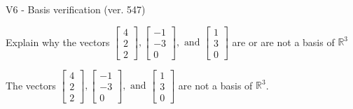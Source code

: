 \begin{exercise}
  \begin{exerciseTitle}V6 - Basis verification (ver. 547)\end{exerciseTitle}
  \begin{exerciseStatement}
    Explain why the vectors \(\left[\begin{array}{r}
4 \\
2 \\
2
\end{array}\right] , \left[\begin{array}{r}
-1 \\
-3 \\
0
\end{array}\right] , \text{ and } \left[\begin{array}{r}
1 \\
3 \\
0
\end{array}\right]\) are or are not a basis of \(\mathbb{R}^3\)	


  \end{exerciseStatement}
  \begin{exerciseAnswer}
   The vectors \(\left[\begin{array}{r}
4 \\
2 \\
2
\end{array}\right] , \left[\begin{array}{r}
-1 \\
-3 \\
0
\end{array}\right] , \text{ and } \left[\begin{array}{r}
1 \\
3 \\
0
\end{array}\right]\) 
  	 are not  a basis of \(\mathbb{R}^3\).
  


  \end{exerciseAnswer}
\end{exercise}